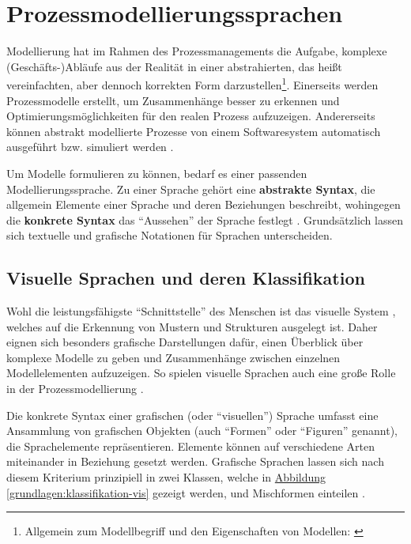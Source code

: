 \documentclass[a4paper,10pt]{sphinxmanual}
\begin{document}
\section{Prozessmodellierungssprachen}
\label{grundlagen:prozessmodellierungssprachen}\label{grundlagen:id1}
Modellierung hat im Rahmen des Prozessmanagements die Aufgabe, komplexe (Geschäfts-)Abläufe aus der Realität in einer abstrahierten, das heißt vereinfachten, aber dennoch korrekten Form darzustellen\footnote{
Allgemein zum Modellbegriff und den Eigenschaften von Modellen: \cite{stachowiak_allgemeine_1973}
}.
Einerseits werden Prozessmodelle erstellt, um Zusammenhänge besser zu erkennen und Optimierungsmöglichkeiten für den realen Prozess aufzuzeigen.
Andererseits können abstrakt modellierte Prozesse von einem Softwaresystem automatisch ausgeführt bzw. simuliert werden \cite{ter_hofstede_business_2003}.

Um Modelle formulieren zu können, bedarf es einer passenden Modellierungssprache.
Zu einer Sprache gehört eine \textbf{abstrakte Syntax}, die allgemein Elemente einer Sprache und deren Beziehungen beschreibt, wohingegen die \textbf{konkrete Syntax} das "`Aussehen"' der Sprache festlegt \cite{clark_applied_2008}.
Grundsätzlich lassen sich textuelle und grafische Notationen für Sprachen unterscheiden.


\subsection{Visuelle Sprachen und deren Klassifikation}
\label{grundlagen:visuelle-sprachen-und-deren-klassifikation}
Wohl die leistungsfähigste "`Schnittstelle"' des Menschen ist das visuelle System \cite{ware_information_2004}, welches auf die Erkennung von Mustern und Strukturen ausgelegt ist.
Daher eignen sich besonders grafische Darstellungen dafür, einen Überblick über komplexe Modelle zu geben und Zusammenhänge zwischen einzelnen Modellelementen aufzuzeigen.
So spielen visuelle Sprachen auch eine große Rolle in der Prozessmodellierung \cite{ter_hofstede_business_2003} \cite{jablonski_perspective_2008}.

Die konkrete Syntax einer grafischen (oder "`visuellen"') Sprache umfasst eine Ansammlung von grafischen Objekten (auch "`Formen"' oder "`Figuren"' genannt), die Sprachelemente repräsentieren.
Elemente können auf verschiedene Arten miteinander in Beziehung gesetzt werden.
Grafische Sprachen lassen sich nach diesem Kriterium prinzipiell in zwei Klassen, welche in \hyperref[grundlagen:klassifikation-vis]{Abbildung  \ref*{grundlagen:klassifikation-vis}} gezeigt werden, und Mischformen einteilen \cite{costagliola_classification_2002}.
\end{document}

